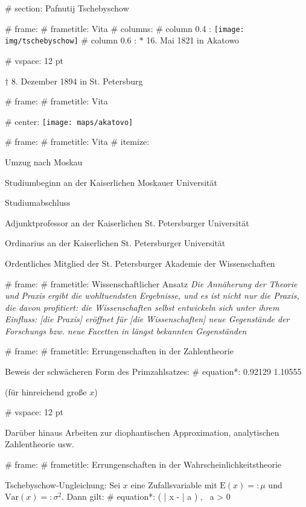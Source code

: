 # section: Pafnutij Tschebyschow

# frame:
  # frametitle: Vita
  # columns:
    # column {0.4 \textwidth}:
      \texttt{[image: img/tschebyschow]}
    # column {0.6 \textwidth}:
      $*$ 16. Mai 1821 in Akatowo

      # vspace: 12 pt

      $\dagger$ 8. Dezember 1894 in St. Petersburg

# frame:
  # frametitle: Vita

  # center:
    \texttt{[image: maps/akatovo]}

# frame:
  # frametitle: Vita
    # itemize:
      \item[1832 (11)] Umzug nach Moskau
      \item[1837 (16)] Studiumbeginn an der Kaiserlichen Moskauer Universität
      \item[1841 (20)] Studiumabschluss
      \item[1847 (26)] Adjunktprofessor an der Kaiserlichen St. Petersburger Universität
      \item[1850 (29)] Ordinarius an der Kaiserlichen St. Petersburger Universität
      \item[1858 (37)] Ordentliches Mitglied der St. Petersburger Akademie der Wissenschaften

# frame:
  # frametitle: Wissenschaftlicher Ansatz
    \emph{\glqq{}Die Annäherung der Theorie und Praxis ergibt die wohltuendsten Ergebnisse,
    und es ist nicht nur die Praxis, die davon profitiert:
    die Wissenschaften selbst entwickeln sich unter ihrem Einfluss:
    [die Praxis] eröffnet für [die Wissenschaften] neue Gegenstände der Forschungs
    bzw. neue Facetten in längst bekannten Gegenständen\grqq}

# frame:
  # frametitle: Errungenschaften in der Zahlentheorie

  Beweis der schwächeren Form des Primzahlsatzes:
  # equation*:
    \num{0.92129} \leqslant {} \leqslant \num{1.10555}

  (für hinreichend große $x$)

  # vspace: 12 pt

  Darüber hinaus Arbeiten zur diophantischen Approximation,
  analytischen Zahlentheorie usw.

# frame:
  # frametitle: Errungenschaften in der Wahrscheinlichkeitstheorie

  Tschebyschow-Ungleichung: Sei $x$ eine Zufallsvariable mit
  $\text{E}(x) =: \mu$ und $\text{Var}(x) =: \sigma^2$. Dann gilt:
  # equation*:
    \!\left( | x - \mu | \geqslant a \right) \leqslant {},
    \ a > 0

